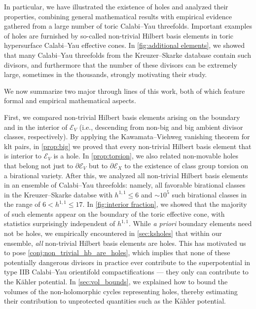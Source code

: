 \documentclass[11pt,dvipsnames]{article}
\theoremstyle{definition}
\begin{document}
In particular, we have illustrated the existence of holes and analyzed their properties,
combining general mathematical results with empirical evidence gathered from a large number of toric Calabi--Yau threefolds. Important examples of holes are furnished by 
so-called non-trivial Hilbert basis elements in toric hypersurface Calabi--Yau effective cones. 
In \cref{fig:additional elements}, we showed that many Calabi--Yau threefolds from the Kreuzer--Skarke database contain such divisors, and furthermore that the number of these divisors can be extremely large, sometimes in the thousands, strongly motivating their study. 

We now summarize two major through lines of this work, both of which feature formal and empirical mathematical aspects.

First, we compared non-trivial Hilbert basis elements arising on the boundary and in the interior of $\mathcal{E}_V$ (i.e., descending from non-big and big ambient divisor classes, respectively). By applying the Kawamata--Viehweg vanishing theorem for klt pairs, in \cref{prop:big} we proved that every non-trivial Hilbert basis element that is interior to $\mathcal{E}_V$ is a hole. In \cref{prop:torsion}, we also related non-movable holes that belong not just to $\partial \mathcal{E}_V$ but to $\partial \mathcal{E}_X$ to the existence of class group torsion on a birational variety. After this, we analyzed all non-trivial Hilbert basis elements in an ensemble of Calabi--Yau threefolds: namely, all favorable birational classes in the Kreuzer--Skarke databse with $h^{1,1}\leq 6$ and $\sim 10^5$ such birational classes in the range of $6<h^{1,1} \leq 17$.
In \cref{fig:interior fraction}, we showed that the majority of such elements appear on the boundary of the toric effective cone, with statistics surprisingly independent of $h^{1,1}$. While \textit{a priori} boundary elements need not be holes, we empirically encountered in \cref{sec:ksholes} that within our ensemble, \textit{all} non-trivial Hilbert basis elements are holes. This has motivated us to pose \cref{conj:non_trivial_hb_are_holes},
which implies that none of these potentially dangerous divisors in practice ever contribute to the superpotential in type IIB Calabi--Yau orientifold compactifications --- they only can contribute to the K\"ahler potential.
In \cref{sec:vol_bounds}, we explained how to bound the volumes of the non-holomorphic cycles representing holes, thereby estimating their contribution to unprotected quantities such as the K\"ahler potential.
\end{document}
